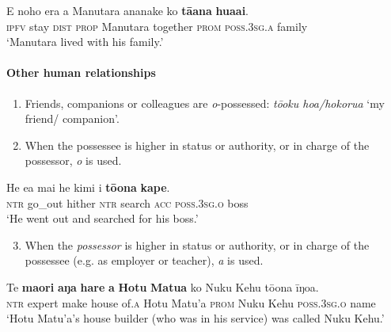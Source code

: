 \ea\label{ex:6.63}
\gll E noho era a Manutara ananake ko \textbf{tā{\ꞌ}ana} \textbf{hua{\ꞌ}ai}. \\
\textsc{ipfv} stay \textsc{dist} \textsc{prop} Manutara together \textsc{prom} \textsc{poss.3sg.a} family \\

\glt 
‘Manutara lived with his family.’ \textstyleExampleref{[R309.039]} 
\z
{}

\paragraph[Other human relationships]{Other human relationships}\label{sec:6.3.3.1.2}
\begin{enumerate}
\item 
Friends, companions or colleagues are \textit{o}{}-possessed: \textit{tō{\ꞌ}oku hoa/hokorua} ‘my friend/ companion’.

\item 
When the possessee is higher in status or authority, or in charge of the possessor, \textit{o} is used.

\end{enumerate}

\ea\label{ex:6.64}
\gll He e{\ꞌ}a mai he kimi i \textbf{tō{\ꞌ}ona} \textbf{kape}. \\
\textsc{ntr} go\_out hither \textsc{ntr} search \textsc{acc} \textsc{poss.3sg.o} boss \\

\glt
‘He went out and searched for his boss.’ \textstyleExampleref{[R237.008]} 
\z

\begin{enumerate}
\setcounter{enumi}{2}
\item 
When the \textit{possessor} is higher in status or authority, or in charge of the possessee (e.g. as employer or teacher), \textit{{\ꞌ}a} is used.

\end{enumerate}

\ea\label{ex:6.65}
\gll Te \textbf{ma{\ꞌ}ori} \textbf{aŋa} \textbf{hare} \textbf{{\ꞌ}a} \textbf{Hotu} \textbf{Matu{\ꞌ}a} ko Nuku Kehu tō{\ꞌ}ona {\ꞌ}īŋoa. \\
\textsc{ntr} expert make house of\textsc{.a} Hotu Matu’a \textsc{prom} Nuku Kehu \textsc{poss.3sg.o} name \\

\glt 
‘Hotu Matu’a’s house builder (who was in his service) was called Nuku Kehu.’ \textstyleExampleref{[Ley-2-12.002]}
\z

